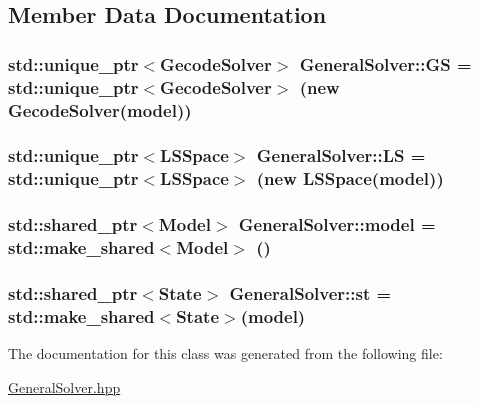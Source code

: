 \subsection{Member Data Documentation}
\hypertarget{class_general_solver_a7edfe7eb7a5b8c492e2aa4b697959a3e}{
\subsubsection[{G\-S}]{\setlength{\rightskip}{0pt plus 5cm}std\-::unique\-\_\-ptr$<${\bf Gecode\-Solver}$>$ General\-Solver\-::\-G\-S = std\-::unique\-\_\-ptr$<${\bf Gecode\-Solver}$>$ (new {\bf Gecode\-Solver}({\bf model}))\hspace{0.3cm}{\ttfamily [private]}}}\label{class_general_solver_a7edfe7eb7a5b8c492e2aa4b697959a3e}
\hypertarget{class_general_solver_ad70adfee5b2c8779c975d91cb24efcc5}{
\subsubsection[{L\-S}]{\setlength{\rightskip}{0pt plus 5cm}std\-::unique\-\_\-ptr$<${\bf L\-S\-Space}$>$ General\-Solver\-::\-L\-S = std\-::unique\-\_\-ptr$<${\bf L\-S\-Space}$>$ (new {\bf L\-S\-Space}({\bf model}))\hspace{0.3cm}{\ttfamily [private]}}}\label{class_general_solver_ad70adfee5b2c8779c975d91cb24efcc5}
\hypertarget{class_general_solver_a83831a1f3765851d544a8badccab3178}{
\subsubsection[{model}]{\setlength{\rightskip}{0pt plus 5cm}std\-::shared\-\_\-ptr$<${\bf Model}$>$ General\-Solver\-::model = std\-::make\-\_\-shared$<${\bf Model}$>$ ()\hspace{0.3cm}{\ttfamily [private]}}}\label{class_general_solver_a83831a1f3765851d544a8badccab3178}
\hypertarget{class_general_solver_aa8f7806985c11c39b355f0720764ce66}{
\subsubsection[{st}]{\setlength{\rightskip}{0pt plus 5cm}std\-::shared\-\_\-ptr$<${\bf State}$>$ General\-Solver\-::st = std\-::make\-\_\-shared$<${\bf State}$>$({\bf model})\hspace{0.3cm}{\ttfamily [private]}}}\label{class_general_solver_aa8f7806985c11c39b355f0720764ce66}


The documentation for this class was generated from the following file\-:\begin{DoxyCompactItemize}
\item 
\hyperlink{_general_solver_8hpp}{General\-Solver.\-hpp}\end{DoxyCompactItemize}
